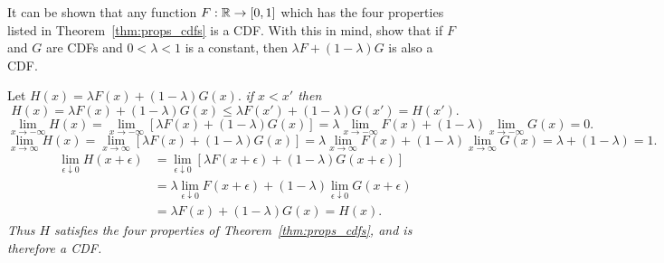 \begin{exercise}
It can be shown that any function $F:\mathbb{R}\to[0,1]$ which has the four properties listed in Theorem~\ref{thm:props_cdfs} is a CDF. With this in mind, show that if $F$ and $G$ are CDFs and $0<\lambda<1$ is a constant, then $\lambda F + (1-\lambda)G$ is also a CDF.
\begin{answer}
Let $H(x) = \lambda F(x) + (1-\lambda)G(x)$. 
\ben
\it if $x < x'$ then 
\[
H(x) = \lambda F(x) + (1-\lambda)G(x) \leq \lambda F(x') + (1-\lambda)G(x') = H(x').
\]
\it
\[
\lim_{x\to-\infty} H(x) 
	= \lim_{x\to-\infty}\left[\lambda F(x)+(1-\lambda)G(x)\right]
	=  \lambda\lim_{x\to-\infty} F(x) + (1-\lambda)\lim_{x\to-\infty} G(x) 
	= 0.
\]
\it
\[
\lim_{x\to\infty} H(x) 
	= \lim_{x\to\infty}\left[\lambda F(x)+(1-\lambda)G(x)\right]
	=  \lambda\lim_{x\to\infty} F(x) + (1-\lambda)\lim_{x\to\infty} G(x) 
	= \lambda + (1-\lambda)
	= 1.
\]
\it
\begin{align*}
\lim_{\epsilon\downarrow 0} H(x+\epsilon) 
	& = \lim_{\epsilon\downarrow 0}\left[\lambda F(x+\epsilon)+(1-\lambda)G(x+\epsilon)\right] \\
	& = \lambda\lim_{\epsilon\downarrow 0} F(x+\epsilon) + (1-\lambda)\lim_{\epsilon\downarrow 0} G(x+\epsilon) \\
	& = \lambda F(x) + (1-\lambda)G(x) 
	= H(x).
\end{align*}
\een
Thus $H$ satisfies the four properties of Theorem~\ref{thm:props_cdfs}, and is therefore a CDF.
\end{answer}

\end{exercise}


